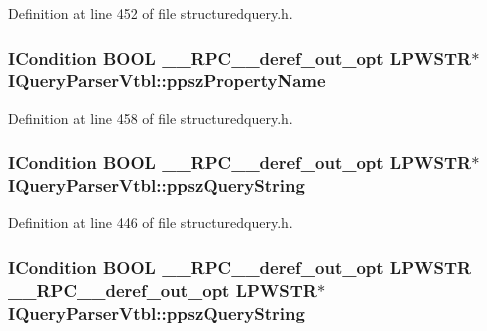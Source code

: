 Definition at line 452 of file structuredquery.\+h.

\subsubsection[{\texorpdfstring{ppsz\+Property\+Name}{ppszPropertyName}}]{ {\bf I\+Condition} {\bf B\+O\+OL} {\bf \+\_\+\+\_\+\+R\+P\+C\+\_\+\+\_\+deref\+\_\+out\+\_\+opt} {\bf L\+P\+W\+S\+TR}$\ast$ I\+Query\+Parser\+Vtbl\+::ppsz\+Property\+Name}\hypertarget{struct_i_query_parser_vtbl_a7ad4dc3627ce9282ad5ba79cf391312f}{}\label{struct_i_query_parser_vtbl_a7ad4dc3627ce9282ad5ba79cf391312f}


Definition at line 458 of file structuredquery.\+h.

\subsubsection[{\texorpdfstring{ppsz\+Query\+String}{ppszQueryString}}]{ {\bf I\+Condition} {\bf B\+O\+OL} {\bf \+\_\+\+\_\+\+R\+P\+C\+\_\+\+\_\+deref\+\_\+out\+\_\+opt} {\bf L\+P\+W\+S\+TR}$\ast$ I\+Query\+Parser\+Vtbl\+::ppsz\+Query\+String}\hypertarget{struct_i_query_parser_vtbl_ac40e10c52a9c7672614a1a2ede5e368a}{}\label{struct_i_query_parser_vtbl_ac40e10c52a9c7672614a1a2ede5e368a}


Definition at line 446 of file structuredquery.\+h.

\subsubsection[{\texorpdfstring{ppsz\+Query\+String}{ppszQueryString}}]{ {\bf I\+Condition} {\bf B\+O\+OL} {\bf \+\_\+\+\_\+\+R\+P\+C\+\_\+\+\_\+deref\+\_\+out\+\_\+opt} {\bf L\+P\+W\+S\+TR} {\bf \+\_\+\+\_\+\+R\+P\+C\+\_\+\+\_\+deref\+\_\+out\+\_\+opt} {\bf L\+P\+W\+S\+TR}$\ast$ I\+Query\+Parser\+Vtbl\+::ppsz\+Query\+String}\hypertarget{struct_i_query_parser_vtbl_aa3d1446a73ccddf08ae6861ab4446024}{}\label{struct_i_query_parser_vtbl_aa3d1446a73ccddf08ae6861ab4446024}


